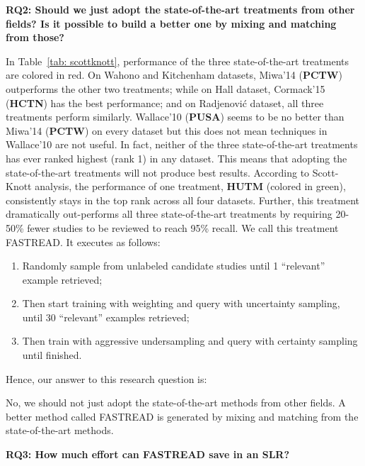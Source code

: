 \documentclass{svjour3}
\theoremstyle{break}
\begin{document}
{\bf RQ2: Should we just adopt the state-of-the-art treatments from other fields? Is it possible to build a better one by mixing and matching from those?}

In Table~\ref{tab: scottknott},  performance of the three state-of-the-art treatments are colored in {\setlength{\fboxsep}{1pt}\colorbox{red!30}{red}}. On Wahono and Kitchenham datasets, Miwa'14 (\textbf{PCTW}) outperforms the other two treatments; while on Hall dataset, Cormack'15 (\textbf{HCTN}) has the best performance; and on Radjenovi{\'c} dataset, all three treatments perform similarly. Wallace'10 (\textbf{PUSA}) seems to be no better than Miwa'14 (\textbf{PCTW}) on every dataset but this does not mean techniques in Wallace'10 are not useful. In fact, neither of the three state-of-the-art treatments has ever ranked highest (rank 1) in any dataset. This means that adopting the state-of-the-art treatments will not produce best results. According to Scott-Knott analysis, the performance of one treatment, \textbf{HUTM} (colored in {\setlength{\fboxsep}{1pt}\colorbox{green!40}{green}}), consistently stays in the top rank across all four datasets.
Further, this treatment dramatically out-performs
all three state-of-the-art treatments by requiring 20-50\% fewer studies to be reviewed to reach 95\% recall.
We call this treatment FASTREAD. It executes as follows:
\begin{enumerate}
\item
Randomly sample from unlabeled candidate studies until 1 ``relevant'' example retrieved;
\item
Then start training with weighting and query with uncertainty sampling, until 30 ``relevant'' examples retrieved;
\item
Then train with aggressive undersampling and query with certainty sampling until finished.
\end{enumerate}
 
 Hence, our answer to this research question is:

\begin{lesson}
    No, we should not just adopt the state-of-the-art methods from other fields. A better method called FASTREAD is generated by mixing and matching from the state-of-the-art methods.
\end{lesson}



\textbf{RQ3: How much effort can FASTREAD save in an SLR?}
\end{document}
